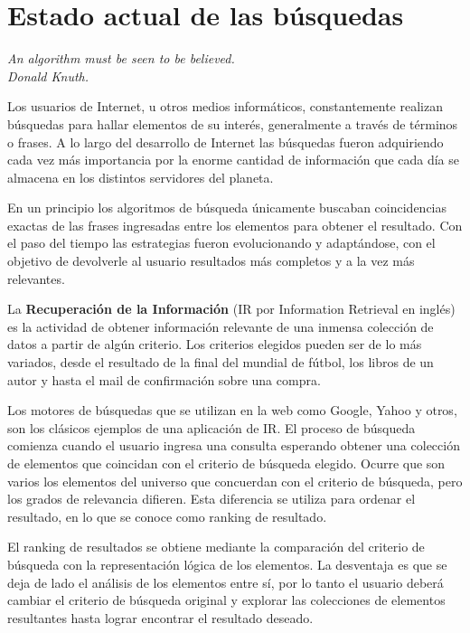\section{Estado actual de las búsquedas}
{\begin{small}%
\begin{flushright}%
\it An algorithm must be seen to be believed.\\Donald Knuth.
\end{flushright}%
\end{small}%
\vspace{.5cm}}
Los usuarios de Internet, u otros medios informáticos, constantemente realizan búsquedas para hallar elementos de su interés, generalmente a través de términos o frases. A lo largo del desarrollo de Internet las búsquedas fueron adquiriendo cada vez más importancia por la enorme cantidad de información que cada día se almacena en los distintos servidores del planeta.

En un principio los algoritmos de búsqueda únicamente buscaban coincidencias exactas de las frases ingresadas entre los elementos para obtener el resultado. Con el paso del tiempo las estrategias fueron evolucionando y adaptándose, con el objetivo de devolverle al usuario resultados más completos y a la vez más relevantes.

La \textbf{Recuperación de la Información} (IR por Information Retrieval en inglés) \cite{BR,MRS,ZM} es la actividad de obtener información relevante de una inmensa colección de datos a partir de algún criterio. Los criterios elegidos pueden ser de lo más variados, desde el resultado de la final del mundial de fútbol, los libros de un autor y hasta el mail de confirmación sobre una compra.

Los motores de búsquedas que se utilizan en la web como Google, Yahoo y otros, son los clásicos ejemplos de una aplicación de IR. El proceso de búsqueda comienza cuando el usuario ingresa una consulta esperando obtener una colección de elementos que coincidan con el criterio de búsqueda elegido. Ocurre que son varios los elementos del universo que concuerdan con el criterio de búsqueda, pero los grados de relevancia difieren. Esta diferencia se utiliza para ordenar el resultado, en lo que se conoce como ranking de resultado.

El ranking de resultados se obtiene mediante la comparación del criterio de búsqueda con la representación lógica de los elementos. La desventaja es que se deja de lado el análisis de los elementos entre sí, por lo tanto el usuario deberá cambiar el criterio de búsqueda original y explorar las colecciones de elementos resultantes hasta lograr encontrar el resultado deseado.

